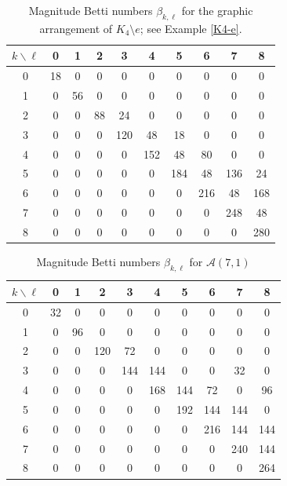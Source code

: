 \documentclass{amsart}
\numberwithin{equation}{section}
\theoremstyle{plain}
\theoremstyle{remark}
\theoremstyle{definition}
\numberwithin{equation}{section}
\newcommand{\A}{\mathcal{A}}
\begin{document}
\begin{table}[htpb]
\centering
\begin{tabular}{c|ccccccccc}
\hline
$k \backslash \ell$ & 0 & 1 & 2 & 3 & 4 & 5 & 6 & 7 & 8 \\
\hline
0 & 18 & 0  & 0  & 0   & 0   & 0   & 0   & 0   &  0\\
1 & 0  & 56 & 0  & 0   & 0   & 0   & 0   & 0   &  0\\
2 & 0  & 0  & 88 & 24  & 0   & 0   & 0   & 0   &  0\\
3 & 0  & 0  & 0  & 120 & 48  & 18  & 0   & 0   & 0\\
4 & 0  & 0  & 0  & 0   & 152 & 48  & 80  & 0   & 0\\
5 & 0  & 0  & 0  & 0   & 0   & 184 & 48  & 136 & 24\\
6 & 0  & 0  & 0  & 0   & 0   & 0   & 216 & 48  & 168\\
7 & 0  & 0  & 0  & 0   & 0   & 0   & 0   & 248 & 48\\
8 & 0  & 0  & 0  & 0   & 0   & 0   & 0   & 0   & 280\\ 
\hline
\end{tabular}
\vspace{1ex}
\caption{Magnitude Betti numbers $\beta_{k,\ell}$ for the graphic arrangement of $K_4 \setminus e$; see Example \ref{K4-e}.}
\label{tab:k4_minus_e}
\end{table}


\begin{table}[htpb]
\centering
\begin{tabular}{c|ccccccccc}
\hline
$k \backslash \ell$ & 0 & 1 & 2 & 3 & 4 & 5 & 6 & 7 & 8 \\
\hline
0 & 32 & 0  & 0  & 0   & 0   & 0   & 0   & 0   &  0\\
1 & 0  & 96 & 0  & 0   & 0   & 0   & 0   & 0   &  0\\
2 & 0  & 0  & 120 & 72  & 0   & 0   & 0   & 0   &  0\\
3 & 0  & 0  & 0  & 144 & 144  & 0  & 0   & 32   & 0\\
4 & 0  & 0  & 0  & 0   & 168 & 144  & 72  & 0   & 96\\
5 & 0  & 0  & 0  & 0   & 0   & 192 & 144  & 144 & 0\\
6 & 0  & 0  & 0  & 0   & 0   & 0   & 216 & 144  & 144\\
7 & 0  & 0  & 0  & 0   & 0   & 0   & 0   & 240 & 144\\
8 & 0  & 0  & 0  & 0   & 0   & 0   & 0   & 0   & 264\\ 
\hline
\end{tabular}
\vspace{1ex}
\caption{Magnitude Betti numbers $\beta_{k,\ell}$ for $\A(7,1)$}
\label{tab:A71}
\end{table}
\end{document}
